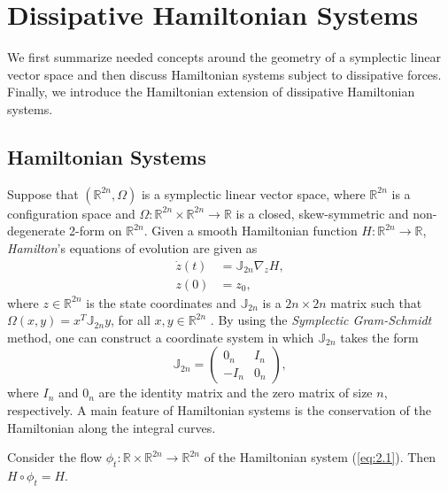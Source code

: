 \section{Dissipative Hamiltonian Systems} \label{sec:2}
We first summarize needed concepts around the geometry of a symplectic linear vector space and then discuss Hamiltonian systems subject to dissipative forces. Finally, we introduce the Hamiltonian extension of dissipative Hamiltonian systems.

\subsection{Hamiltonian Systems} \label{sec:2.1} Suppose that $(\mathbb{R}^{2n},\Omega)$ is a symplectic linear vector space, where $\mathbb{R}^{2n}$ is a configuration space and $\Omega:\mathbb{R}^{2n}\times \mathbb{R}^{2n} \to \mathbb R$ is a closed, skew-symmetric and non-degenerate 2-form on $\mathbb{R}^{2n}$. Given a smooth Hamiltonian function $H:\mathbb{R}^{2n}\to \mathbb R$, \emph{Hamilton}'s equations of evolution are given as
\begin{equation} \label{eq:2.1}
	\begin{aligned}
	\dot {z}(t) &= \mathbb J_{2n} \nabla_{z} H, \\
	z(0) &= z_0,
	\end{aligned}
\end{equation}
where $z \in\mathbb R^{2n}$ is the state coordinates and $\mathbb J_{2n}$ is a $2n\times 2n$ matrix such that $\Omega(x,y) = x^T \mathbb J_{2n} y$, for all $x,y\in \mathbb R^{2n}$ \cite{Marsden:2010:IMS:1965128}. By using the \emph{Symplectic Gram-Schmidt} \cite{de2006symplectic} method, one can construct a coordinate system in which $\mathbb J_{2n}$ takes the form
\begin{equation} \label{eq:2.2}
	\mathbb{J}_{2n} = 
	\begin{pmatrix}
		0_n & I_n \\
		-I_n & 0_n
	\end{pmatrix},
\end{equation}
where $I_n$ and $0_n$ are the identity matrix and the zero matrix of size $n$, respectively. A main feature of Hamiltonian systems is the conservation of the Hamiltonian along the integral curves.
\begin{theorem} \label{theorem:2.1}
\cite{Marsden:2010:IMS:1965128} Consider the flow $\phi_t:\mathbb R\times \mathbb R^{2n} \to \mathbb R^{2n}$ of the Hamiltonian system (\ref{eq:2.1}). Then $H\circ \phi_t = H$.
\end{theorem}

